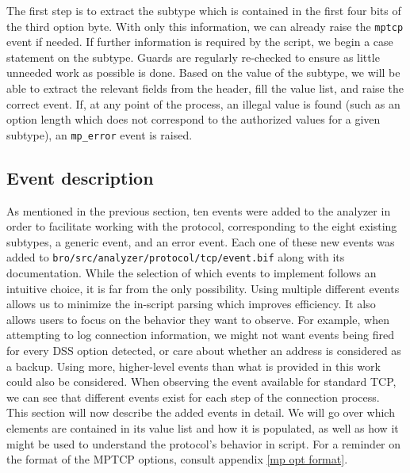 \documentclass[12pt, a4paper, oneside]{article} %
\begin{document}
The first step is to extract the subtype which is contained in the first four bits of the third option byte. With only this information, we can already raise the \texttt{mptcp} event if needed. If further information is required by the script, we begin a case statement on the subtype. Guards are regularly re-checked to ensure as little unneeded work as possible is done. Based on the value of the subtype, we will be able to extract the relevant fields from the header, fill the value list, and raise the correct event. If, at any point of the process, an illegal value is found (such as an option length which does not correspond to the authorized values for a given subtype), an \texttt{mp\_error} event is raised.

\subsection{Event description}
As mentioned in the previous section, ten events were added to the analyzer in order to facilitate working with the protocol, corresponding to the eight existing subtypes, a generic event, and an error event. Each one of these new events was added to \texttt{bro/src/analyzer/protocol/tcp/event.bif} along with its documentation. While the selection of which events to implement follows an intuitive choice, it is far from the only possibility. Using multiple different events allows us to minimize the in-script parsing which improves efficiency. It also allows users to focus on the behavior they want to observe. For example, when attempting to log connection information, we might not want events being fired for every DSS option detected, or care about whether an address is considered as a backup. Using more, higher-level events than what is provided in this work could also be considered. When observing the event available for standard TCP, we can see that different events exist for each step of the connection process. \\

This section will now describe the added events in detail. We will go over which elements are contained in its value list and how it is populated, as well as how it might be used to understand the protocol's behavior in script. For a reminder on the format of the MPTCP options, consult appendix \ref{mp opt format}.
\end{document}
